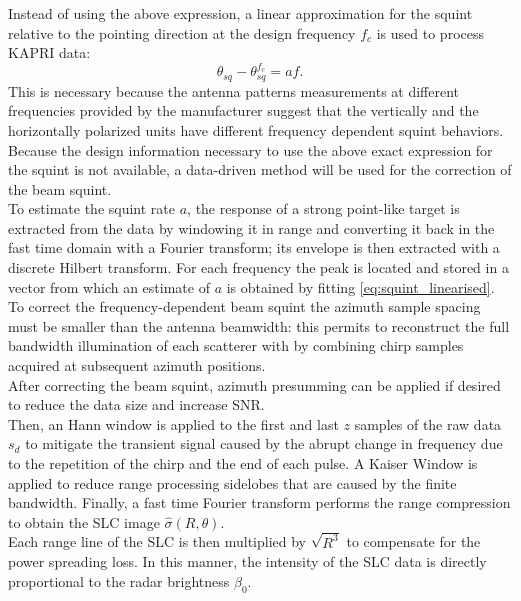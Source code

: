 Instead of using the above expression, a linear approximation for the squint relative to the pointing direction at the design frequency $f_c$ is used to process KAPRI data:
\begin{equation}\label{eq:squint_linearised}
	\theta_{sq} - \theta_{sq}^{f_{c}}  =  a f.
\end{equation}
This is necessary because the antenna patterns measurements at different frequencies provided by the manufacturer suggest that the vertically and the horizontally polarized units have different frequency dependent squint behaviors. Because the design information necessary to use the above exact expression for the squint is not available, a data-driven method will be used for the correction of the beam squint.\\ To estimate the squint rate $a$, the response of a strong point-like target is extracted from the data by windowing it in range and converting it back in the fast time domain with a Fourier transform; its envelope is then extracted with a discrete Hilbert transform. For each frequency the peak is located and stored in a vector from which an estimate of $a$ is obtained by fitting \eqref{eq:squint_linearised}.\\
To correct the frequency-dependent beam squint the azimuth sample spacing must be smaller than the antenna beamwidth: this permits to reconstruct the full bandwidth illumination of each scatterer with by combining chirp samples acquired at subsequent azimuth positions.\\
After correcting the beam squint, azimuth presumming can be applied if desired to reduce the data size and increase SNR.\\ Then, an Hann window is applied to the first and last $z$ samples of the raw data $s_{d}$ to mitigate the transient signal caused by the abrupt change in frequency due to the repetition of the chirp and the end of each pulse. A Kaiser Window is applied to reduce range processing sidelobes that are caused by the finite bandwidth. Finally, a fast time Fourier transform performs the range compression to obtain the SLC image $\hat{\sigma}\left(R, \theta\right)$.\\ Each range line of the SLC  is then multiplied by $\sqrt{R^3}$ to compensate for the power spreading loss. In this manner, the intensity of the SLC data is directly proportional to the radar brightness $\beta_{0}$\cite{Raney1994}. 
